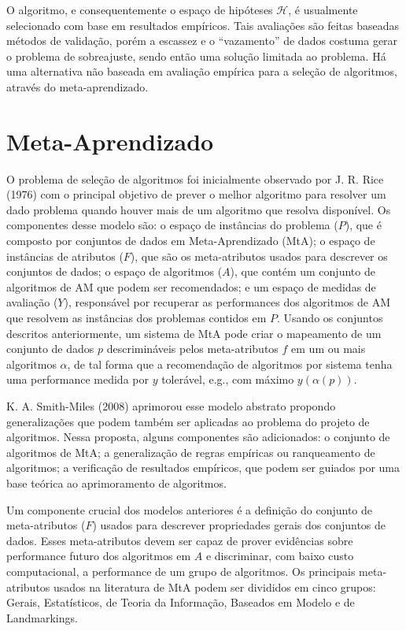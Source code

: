 O algoritmo, e consequentemente o espaço de hipóteses $\mathcal{H}$, é
usualmente selecionado com base em resultados empíricos. Tais avaliações são
feitas baseadas métodos de validação, porém a escassez e o ``vazamento'' de
dados costuma gerar o problema de sobreajuste, sendo então uma solução limitada
ao problema. Há uma alternativa não baseada em avaliação empírica para a
seleção de algoritmos, através do meta-aprendizado.

\section{Meta-Aprendizado}
\label{sec:metalearning}
O problema de seleção de algoritmos foi inicialmente observado por J. R. Rice
(1976) \cite{Rice1976} com o principal objetivo de prever o melhor algoritmo
para resolver um dado problema quando houver mais de um algoritmo que resolva
disponível.
Os componentes desse modelo são: o espaço de instâncias do problema ($P$), que
é composto por conjuntos de dados em Meta-Aprendizado (MtA); o espaço de
instâncias de atributos ($F$), que são os meta-atributos usados para descrever
os conjuntos de dados; o espaço de algoritmos ($A$), que contém um conjunto de
algoritmos de AM que podem ser recomendados; e um espaço de medidas de
avaliação ($Y$), responsável por recuperar as performances dos algoritmos de AM
que resolvem as instâncias dos problemas contidos em $P$.
Usando os conjuntos descritos anteriormente, um sistema de MtA pode criar o
mapeamento de um conjunto de dados $p$ descrimináveis pelos meta-atributos $f$
em um ou mais algoritmos $\alpha$, de tal forma que a recomendação de
algoritmos por sistema tenha uma performance medida por $y$ tolerável, e.g.,
com máximo $y(\alpha(p))$.

K. A. Smith-Miles (2008) \cite{SmithMiles2008} aprimorou esse modelo abstrato
propondo generalizações que podem também ser aplicadas ao problema do projeto
de algoritmos.  Nessa proposta, alguns componentes são adicionados: o conjunto
de algoritmos de MtA; a generalização de regras empíricas ou ranqueamento de
algoritmos; a verificação de resultados empíricos, que podem ser guiados por
uma base teórica ao aprimoramento de algoritmos.

Um componente crucial dos modelos anteriores é a definição do conjunto de
meta-atributos ($F$) usados para descrever propriedades gerais dos conjuntos de
dados. Esses meta-atributos devem ser capaz de prover evidências sobre
performance futuro dos algoritmos em $A$ \cite{Soares2001, Reif2012} e
discriminar, com baixo custo computacional, a performance de um grupo de
algoritmos. Os principais meta-atributos usados na literatura de MtA podem ser
divididos em cinco grupos: Gerais, Estatísticos, de Teoria da Informação,
Baseados em Modelo e de Landmarkings.

